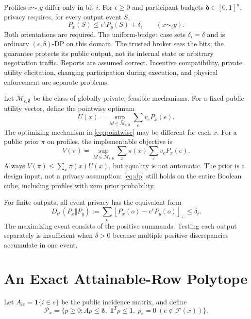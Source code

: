 \documentclass[sigconf,nonacm]{aamas}
\newcommand{\F}{\mathcal F}
\newcommand{\PP}{\mathcal P}
\newcommand{\ind}{\mathbf 1}
\begin{document}
Profiles $x\sim_i y$ differ only in bit $i$. For $\epsilon\geq0$ and participant budgets $\boldsymbol\delta\in[0,1]^n$, privacy requires, for every output event $S$,
\begin{equation}\label{eq:dp}
 P_x(S)\leq e^\epsilon P_y(S)+\delta_i
 \qquad(x\sim_i y).
\end{equation}
Both orientations are required. The uniform-budget case sets $\delta_i=\delta$ and is ordinary $(\epsilon,\delta)$-DP on this domain. The trusted broker sees the bits; the guarantee protects its public output, not its internal state or arbitrary negotiation traffic. Reports are assumed correct. Incentive compatibility, private utility elicitation, changing participation during execution, and physical enforcement are separate problems.

Let $\mathcal M_{\epsilon,\boldsymbol\delta}$ be the class of globally private, feasible mechanisms. For a fixed public utility vector, define the pointwise optimum
\begin{equation}\label{eq:pointwise}
 U(x)=\sup_{M\in\mathcal M_{\epsilon,\boldsymbol\delta}}
          \sum_e v_eP_x(e).
\end{equation}
The optimizing mechanism in \eqref{eq:pointwise} may be different for each $x$. For a public prior $\pi$ on profiles, the implementable objective is
\begin{equation}\label{eq:bayes}
 V(\pi)=\sup_{M\in\mathcal M_{\epsilon,\boldsymbol\delta}}
        \sum_x\pi(x)\sum_e v_eP_x(e).
\end{equation}
Always $V(\pi)\leq\sum_x\pi(x)U(x)$, but equality is not automatic. The prior is a design input, not a privacy assumption: \eqref{eq:dp} still holds on the entire Boolean cube, including profiles with zero prior probability.

For finite outputs, all-event privacy has the equivalent form~\cite{dwork2014}
\begin{equation}\label{eq:hockey}
 D_{e^\epsilon}(P_x\Vert P_y)
 :=\sum_o[P_x(o)-e^\epsilon P_y(o)]_+\leq\delta_i.
\end{equation}
The maximizing event consists of the positive summands. Testing each output separately is insufficient when $\delta>0$ because multiple positive discrepancies accumulate in one event.

\section{An Exact Attainable-Row Polytope}\label{sec:projection}
Let $A_{ie}=\ind\{i\in e\}$ be the public incidence matrix, and define
\begin{equation}\label{eq:polytope}
\PP_x=\{p\geq0:Ap\leq\boldsymbol\delta,\;
   \ind^Tp\leq1,\;p_e=0\ (e\notin\F(x))\}.
\end{equation}
\end{document}
